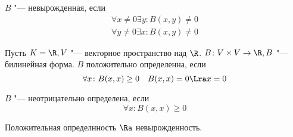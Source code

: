 \begin{Def}
	$B$ "--- невырожденная, если
	\begin{gather*}
		\forall x \ne 0 \exists y \colon B(x, y) \ne 0 \\
		\forall y \ne 0 \exists x \colon B(x, y) \ne 0
	\end{gather*}
\end{Def}

\begin{Def}
	Пусть $K = \R, V$ "--- векторное пространство над $\R$.
	$B \colon V \times V \to \R, B$ "--- билинейная форма.
	$B$ положительно определенна, если
	\[ \forall x\colon B(x, x) \ge 0 \quad B(x, x) = 0 \Lra x = 0 \]
\end{Def}

\begin{Def}
	$B$ "--- неотрицательно определена, если
	\[ \forall x \colon B(x, x) \ge 0 \]
\end{Def}

\begin{Rem}
	Положительная определнность $\Ra$ невырожденность.
\end{Rem}

